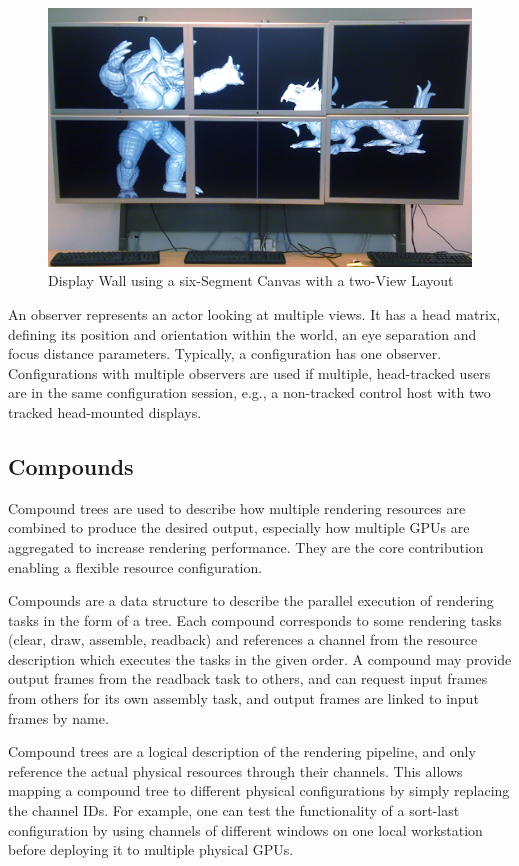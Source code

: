 \begin{figure}[ht!]\center
 \includegraphics[width=.9\textwidth]{images/wallLayout.jpg}
 {\caption{\label{fDisplay}Display Wall using a six-Segment Canvas with a two-View Layout}}
\end{figure}

An \textsf{observer} represents an actor looking at multiple views. It has a
head matrix, defining its position and orientation within the world, an eye
separation and focus distance parameters. Typically, a configuration has one
observer. Configurations with multiple observers are used if multiple,
head-tracked users are in the same configuration session, e.g., a non-tracked
control host with two tracked head-mounted displays.

\subsection{Compounds}

Compound trees are used to describe how multiple rendering resources are
combined to produce the desired output, especially how multiple GPUs are
aggregated to increase rendering performance. They are the core contribution
enabling a flexible resource configuration.

Compounds are a data structure to describe the parallel execution of rendering
tasks in the form of a tree.  Each compound corresponds to some rendering tasks
(clear, draw, assemble, readback) and references a  channel from the resource
description which executes the tasks in the given order. A compound may provide
output frames from the readback task to others, and can request input
frames from others for its own assembly task, and output frames are linked to
input frames by name.

Compound trees are a logical description of the rendering pipeline, and only
reference the actual physical resources through their channels. This allows
mapping a compound tree to different physical configurations by simply replacing
the channel IDs. For example, one can test the functionality of a sort-last
configuration by using channels of different windows on one local workstation
before deploying it to multiple physical GPUs.

